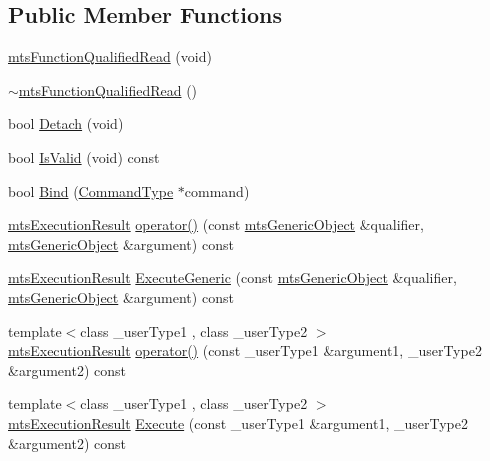 \subsection*{Public Member Functions}
\begin{DoxyCompactItemize}
\item 
\hyperlink{classmts_function_qualified_read_a1776e3e0648e47435d9460b1e964140f}{mts\-Function\-Qualified\-Read} (void)
\item 
\hyperlink{classmts_function_qualified_read_a2d4381507c8d8b10f6b59187b6c67416}{$\sim$mts\-Function\-Qualified\-Read} ()
\item 
bool \hyperlink{classmts_function_qualified_read_a6e2358ffab4ae5da9acb8a4606c613f8}{Detach} (void)
\item 
bool \hyperlink{classmts_function_qualified_read_a521833fa551ad5e8f79492cd88d3df14}{Is\-Valid} (void) const 
\item 
bool \hyperlink{classmts_function_qualified_read_a0f89963fbe16521ab4d716c89a64d0c8}{Bind} (\hyperlink{classmts_function_qualified_read_ae78bcee54ee0392f510d2f33600c316f}{Command\-Type} $\ast$command)
\item 
\hyperlink{classmts_execution_result}{mts\-Execution\-Result} \hyperlink{classmts_function_qualified_read_a6a337f5f2c1f735f54b54b2610dd9c86}{operator()} (const \hyperlink{classmts_generic_object}{mts\-Generic\-Object} \&qualifier, \hyperlink{classmts_generic_object}{mts\-Generic\-Object} \&argument) const 
\item 
\hyperlink{classmts_execution_result}{mts\-Execution\-Result} \hyperlink{classmts_function_qualified_read_a7dd735595d526646a659c89e79d43c7b}{Execute\-Generic} (const \hyperlink{classmts_generic_object}{mts\-Generic\-Object} \&qualifier, \hyperlink{classmts_generic_object}{mts\-Generic\-Object} \&argument) const 
\item 
{\footnotesize template$<$class \-\_\-user\-Type1 , class \-\_\-user\-Type2 $>$ }\\\hyperlink{classmts_execution_result}{mts\-Execution\-Result} \hyperlink{classmts_function_qualified_read_a8c5c10827c54908449f9c969a79135f8}{operator()} (const \-\_\-user\-Type1 \&argument1, \-\_\-user\-Type2 \&argument2) const 
\item 
{\footnotesize template$<$class \-\_\-user\-Type1 , class \-\_\-user\-Type2 $>$ }\\\hyperlink{classmts_execution_result}{mts\-Execution\-Result} \hyperlink{classmts_function_qualified_read_aedfbc1198c539525c27c5ae5316e3fa0}{Execute} (const \-\_\-user\-Type1 \&argument1, \-\_\-user\-Type2 \&argument2) const 

\end{DoxyCompactItemize}
